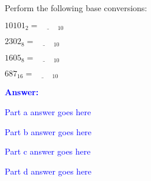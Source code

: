 \item{}
Perform the following base conversions:
\begin{list}{\textbf{}}{}
    \item $10101_{2}=\underline{\phantom{1234}}\,_{10}$
    \item $2302_{8}=\underline{\phantom{1234}}\,_{10}$
    \item $1605_{8}=\underline{\phantom{1234}}\,_{10}$
    \item $687_{16}=\underline{\phantom{1234}}\,_{10}$
\end{list}
\vskip12pt
\ifanswers
\textcolor{blue}{
\textbf{Answer:}\\
\begin{list}{\textbf{}}{}
    \item Part a answer goes here
    \item Part b answer goes here
    \item Part c answer goes here
    \item Part d answer goes here
\end{list}
}
\newpage
\fi
